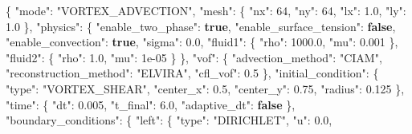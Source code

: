 \documentclass[
  10pt,
]{article}
\newenvironment{Shaded}{}{}
\newcommand{\DataTypeTok}[1]{\textcolor[rgb]{0.56,0.13,0.00}{#1}}
\newcommand{\DecValTok}[1]{\textcolor[rgb]{0.25,0.63,0.44}{#1}}
\newcommand{\FloatTok}[1]{\textcolor[rgb]{0.25,0.63,0.44}{#1}}
\newcommand{\FunctionTok}[1]{\textcolor[rgb]{0.02,0.16,0.49}{#1}}
\newcommand{\KeywordTok}[1]{\textcolor[rgb]{0.00,0.44,0.13}{\textbf{#1}}}
\newcommand{\StringTok}[1]{\textcolor[rgb]{0.25,0.44,0.63}{#1}}
\begin{document}
\begin{Shaded}
\begin{Highlighting}[]
\FunctionTok{\{}
  \DataTypeTok{"mode"}\FunctionTok{:} \StringTok{"VORTEX\_ADVECTION"}\FunctionTok{,}
  \DataTypeTok{"mesh"}\FunctionTok{:} \FunctionTok{\{}
    \DataTypeTok{"nx"}\FunctionTok{:} \DecValTok{64}\FunctionTok{,}
    \DataTypeTok{"ny"}\FunctionTok{:} \DecValTok{64}\FunctionTok{,}
    \DataTypeTok{"lx"}\FunctionTok{:} \FloatTok{1.0}\FunctionTok{,}
    \DataTypeTok{"ly"}\FunctionTok{:} \FloatTok{1.0}
  \FunctionTok{\},}
  \DataTypeTok{"physics"}\FunctionTok{:} \FunctionTok{\{}
    \DataTypeTok{"enable\_two\_phase"}\FunctionTok{:} \KeywordTok{true}\FunctionTok{,}
    \DataTypeTok{"enable\_surface\_tension"}\FunctionTok{:} \KeywordTok{false}\FunctionTok{,}
    \DataTypeTok{"enable\_convection"}\FunctionTok{:} \KeywordTok{true}\FunctionTok{,}
    \DataTypeTok{"sigma"}\FunctionTok{:} \FloatTok{0.0}\FunctionTok{,}
    \DataTypeTok{"fluid1"}\FunctionTok{:} \FunctionTok{\{}
      \DataTypeTok{"rho"}\FunctionTok{:} \FloatTok{1000.0}\FunctionTok{,}
      \DataTypeTok{"mu"}\FunctionTok{:} \FloatTok{0.001}
    \FunctionTok{\},}
    \DataTypeTok{"fluid2"}\FunctionTok{:} \FunctionTok{\{}
      \DataTypeTok{"rho"}\FunctionTok{:} \FloatTok{1.0}\FunctionTok{,}
      \DataTypeTok{"mu"}\FunctionTok{:} \DecValTok{1e{-}05}
    \FunctionTok{\}}
  \FunctionTok{\},}
  \DataTypeTok{"vof"}\FunctionTok{:} \FunctionTok{\{}
    \DataTypeTok{"advection\_method"}\FunctionTok{:} \StringTok{"CIAM"}\FunctionTok{,}
    \DataTypeTok{"reconstruction\_method"}\FunctionTok{:} \StringTok{"ELVIRA"}\FunctionTok{,}
    \DataTypeTok{"cfl\_vof"}\FunctionTok{:} \FloatTok{0.5}
  \FunctionTok{\},}
  \DataTypeTok{"initial\_condition"}\FunctionTok{:} \FunctionTok{\{}
    \DataTypeTok{"type"}\FunctionTok{:} \StringTok{"VORTEX\_SHEAR"}\FunctionTok{,}
    \DataTypeTok{"center\_x"}\FunctionTok{:} \FloatTok{0.5}\FunctionTok{,}
    \DataTypeTok{"center\_y"}\FunctionTok{:} \FloatTok{0.75}\FunctionTok{,}
    \DataTypeTok{"radius"}\FunctionTok{:} \FloatTok{0.125}
  \FunctionTok{\},}
  \DataTypeTok{"time"}\FunctionTok{:} \FunctionTok{\{}
    \DataTypeTok{"dt"}\FunctionTok{:} \FloatTok{0.005}\FunctionTok{,}
    \DataTypeTok{"t\_final"}\FunctionTok{:} \FloatTok{6.0}\FunctionTok{,}
    \DataTypeTok{"adaptive\_dt"}\FunctionTok{:} \KeywordTok{false}
  \FunctionTok{\},}
  \DataTypeTok{"boundary\_conditions"}\FunctionTok{:} \FunctionTok{\{}
    \DataTypeTok{"left"}\FunctionTok{:} \FunctionTok{\{}
      \DataTypeTok{"type"}\FunctionTok{:} \StringTok{"DIRICHLET"}\FunctionTok{,}
      \DataTypeTok{"u"}\FunctionTok{:} \FloatTok{0.0}\FunctionTok{,}

\end{Highlighting}
\end{Shaded}
\end{document}
